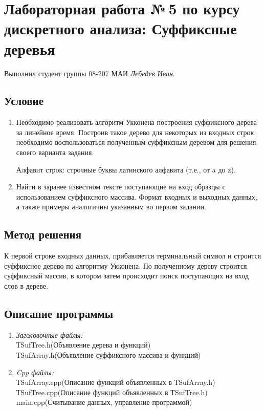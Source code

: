 \documentclass[12pt]{article}
\begin{document}
\section*{Лабораторная работа №\,5 по курсу дискретного анализа: Суффиксные деревья}

Выполнил студент группы 08-207 МАИ \textit{Лебедев Иван}.

\subsection*{Условие}

\begin{enumerate}
\item Необходимо реализовать алгоритм Укконена построения суффиксного дерева за линейное время. Построив такое дерево для некоторых из входных строк, необходимо воспользоваться полученным суффиксным деревом для решения своего варианта задания.

Алфавит строк: строчные буквы латинского алфавита (т.е., от a до z).
\item Найти в заранее известном тексте поступающие на вход образцы с использованием суффиксного массива. Формат входных и выходных данных, а также примеры аналогичны указанным во первом задании.
\end{enumerate}

\subsection*{Метод решения}
\par К первой строке входных данных, прибавляется терминальный символ и строится суффиксное дерево по алгоритму Укконена. По полученному дереву строится суффиксный массив, в котором затем происходит поиск поступающих на вход слов в дереве.

\subsection*{Описание программы}

\begin{enumerate}
\item\textsl{Заголовочные файлы:}\\  ТSufTree.h(Объявление дерева и функций)\\  ТSufArray.h(Объявление суффиксного массива и функций)
\item\textsl{Cpp файлы:}\\  ТSufArray.cpp(Описание функций объявленных в ТSufArray.h)\\  ТSufTree.cpp(Описание функций объявленных в ТSufTree.h)\\ main.cpp(Считывание данных, управление программой)
\end{enumerate}
\end{document}
